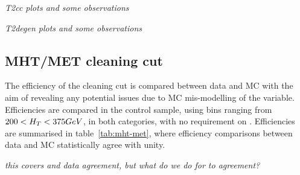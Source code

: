 \emph{T2cc plots and some observations}

\emph{T2degen plots and some observations}

\subsection{MHT/MET cleaning cut}
\label{sec:mhtmet_syst}
The efficiency of the \mhtmet cleaning cut is compared between data and MC with 
the aim of revealing any potential issues due to MC mis-modelling of the 
variable. Efficiencies are compared in the \mj control sample, using \HT bins 
ranging from $200 < H_T < 375 GeV$, in both \nj categories, with no requirement
on \nb. Efficiencies are summarised in table~\ref{tab:mht-met}, where 
efficiency comparisons between data and MC statistically agree with unity.

\emph{this covers \FULLSIM and data agreement, but what do we do for \FASTSIM to 
\FULLSIM agreement?}

